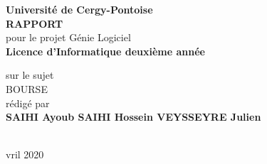 
\begin{titlepage}{
    \begin{center}
        \vspace* {25mm}
        {\Large \textbf {Université de Cergy-Pontoise}} \\
        \vspace* {10mm}
        {\Large \textbf {RAPPORT}} \\
        \vspace* {10mm}
        pour le projet Génie Logiciel \\
        \textbf {Licence d'Informatique deuxième année} \\
        \vspace* {10mm}

	sur le sujet \\
        \vspace* {10mm}
	{\Huge \textsf{BOURSE}} \\
        \vspace* {10mm}
 	rédigé par \\
        \vspace* {10mm}
        {\Large \textbf {SAIHI Ayoub SAIHI Hossein VEYSSEYRE Julien}} \\
				\vspace* {10mm}
				 \\
        \date Avril 2020
        \vspace* {10mm}
	\end{center}
}
\end{titlepage}
